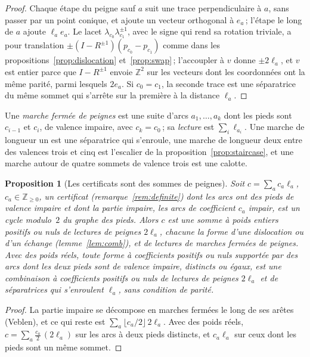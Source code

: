 \documentclass[11pt,a4paper]{article}
\newtheorem{proposition}{Proposition}
\newcommand{\Z}{\mathbb{Z}}
\begin{document}
\begin{proof}
Chaque étape du peigne sauf $a$ suit une trace perpendiculaire à $a$, sans
passer par un point conique, et ajoute un vecteur orthogonal à $e_a$\,;
l'étape le long de $a$ ajoute $\ell_a e_a$. Le lacet $\lambda_{c_0}
\lambda_{c_1}^{\pm1}$, avec le signe qui rend sa rotation triviale, a pour
translation $\pm(I - R^{\pm1})(p_{c_0} - p_{c_1})$ comme dans les
propositions~\ref{prop:dislocation} et~\ref{prop:swap}\,; l'accoupler à $v$
donne $\pm 2\ell_a$, et $v$ est entier parce que $I - R^{\pm1}$ envoie $\Z^2$
sur les vecteurs dont les coordonnées ont la même parité, parmi lesquels
$2e_a$. Si $c_0 = c_1$, la seconde trace est une séparatrice du même sommet
qui s'arrête sur la première à la distance $\ell_a$.
\end{proof}

Une \emph{marche fermée de peignes} est une suite d'arcs $a_1, \dots, a_k$
dont les pieds sont $c_{i-1}$ et $c_i$, de valence impaire, avec $c_k =
c_0$\,; sa \emph{lecture} est $\sum_i \ell_{a_i}$. Une marche de longueur un
est une séparatrice qui s'enroule, une marche de longueur deux entre des
valences trois et cinq est l'escalier de la proposition~\ref{prop:staircase},
et une marche autour de quatre sommets de valence trois est une calotte.

\begin{proposition}[Les certificats sont des sommes de peignes]\label{thm:combs}
Soit $c = \sum_a c_a\ell_a$, $c_a \in \Z_{\ge0}$, un certificat
(remarque~\ref{rem:definite}) dont les arcs ont des pieds de valence impaire
et dont la partie impaire, les arcs de coefficient $c_a$ impair, est un cycle
modulo~$2$ du graphe des pieds. Alors $c$ est une somme à poids entiers
positifs ou nuls de lectures de peignes $2\ell_a$, chacune la forme d'une
dislocation ou d'un échange (lemme~\ref{lem:comb}), et de lectures de marches
fermées de peignes. Avec des poids réels, toute forme à coefficients positifs
ou nuls supportée par des arcs dont les deux pieds sont de valence impaire,
distincts ou égaux, est une combinaison à coefficients positifs ou nuls de
lectures de peignes $2\ell_a$ et de séparatrices qui s'enroulent $\ell_a$,
sans condition de parité.
\end{proposition}

\begin{proof}
La partie impaire se décompose en marches fermées le long de ses arêtes
(Veblen), et ce qui reste est $\sum_a \lfloor c_a/2 \rfloor\,2\ell_a$. Avec
des poids réels, $c = \sum_a \tfrac{c_a}{2}\,(2\ell_a)$ sur les arcs à deux
pieds distincts, et $c_a\ell_a$ sur ceux dont les pieds sont un même sommet.
\end{proof}
\end{document}
